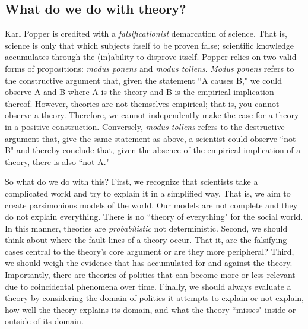 \documentclass[10pt]{article}
\begin{document}
\subsection{What do we do with theory?}

Karl Popper is credited with a \textit{falsificationist} demarcation of science. That is, science is only that which subjects itself to be proven false; scientific knowledge accumulates through the (in)ability to disprove itself. Popper relies on two valid forms of propositions: \textit{modus ponens} and \textit{modus tollens}. \textit{Modus ponens} refers to the constructive argument that, given the statement ``A causes B," we could observe A and B where A is the theory and B is the empirical implication thereof. However, theories are not themselves empirical; that is, you cannot observe a theory. Therefore, we cannot independently make the case for a theory in a positive construction. Conversely, \textit{modus tollens} refers to the destructive argument that, give the same statement as above, a scientist could observe ``not B" and thereby conclude that, given the absence of the empirical implication of a theory, there is also ``not A." 

So what do we do with this? First, we recognize that scientists take a complicated world and try to explain it in a simplified way. That is, we aim to create parsimonious models of the world. Our models are not complete and they do not explain everything. There is no ``theory of everything" for the social world. In this manner, theories are \textit{probabilistic} not deterministic. Second, we should think about where the fault lines of a theory occur. That it, are the falsifying cases central to the theory's core argument or are they more peripheral? Third, we should weigh the evidence that has accumulated for and against the theory. Importantly, there are theories of politics that can become more or less relevant due to coincidental phenomena over time. Finally, we should always evaluate a theory by considering the domain of politics it attempts to explain or not explain, how well the theory explains its domain, and what the theory ``misses" inside or outside of its domain. 
\end{document}
